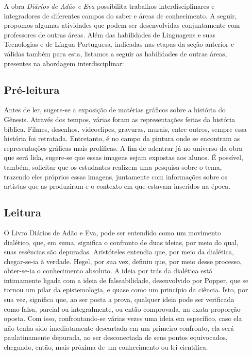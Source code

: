 \documentclass[12pt]{extarticle}
\begin{document}

A obra \emph{Diários de Adão e Eva} possibilita trabalhos
interdisciplinares e integradores de diferentes campos do saber e áreas
de conhecimento. A seguir, propomos algumas atividades que podem ser
desenvolvidas conjuntamente com professores de outras áreas. Além das
habilidades de Linguagens e suas Tecnologias e de Língua Portuguesa,
indicadas nas etapas da seção anterior e válidas também para esta,
listamos a seguir as habilidades de outras áreas, presentes na abordagem
interdisciplinar:

\subsection{Pré-leitura}

Antes de ler, sugere-se a exposição de matérias gráficos
sobre a história do Gênesis. Através dos tempos, várias foram as
representações feitas da história bíblica. Filmes, desenhos,
videoclipes, gravuras, murais, entre outros, sempre essa história foi
retratada. Entretanto, é no campo da pintura onde se encontram as
representações gráficas mais prolíficas. A fim de adentrar já no
universo da obra que será lida, sugere-se que essas imagens sejam
expostas aos alunos. É possível, também, solicitar que os estudantes
realizem uma pesquisa sobre o tema, trazendo eles próprios essas
imagens, juntamente com informações sobre os artistas que as produziram
e o contexto em que estavam inseridos na época.

\subsection{Leitura}

O Livro Diários de Adão e Eva, pode ser entendido como um
movimento dialético, que, em suma, significa o confronto de duas ideias,
por meio do qual, suas essências são depuradas. Aristóteles entendia
que, por meio da dialética, chegar-se-ia à verdade. Hegel, por sua vez,
definiu que, por meio desse processo, obter-se-ia o conhecimento
absoluto. A ideia por trás da dialética está intimamente ligada com a
ideia de falseabilidade, desenvolvido por Popper, que se tornou um pilar
da epistemologia, e quase como um princípio da ciência. Isto, por sua
vez, significa que, ao ser posta a prova, qualquer ideia pode ser
verificada como falsa, parcial ou integralmente, ou então comprovada, na
exata proporção oposta. Com isso, confrontando-se várias vezes uma ideia
em específico, caso ela não tenha sido imediatamente descartada em um
primeiro confronto, ela será paulatinamente depurada, ao ser
desconectada de seus pontos equivocados, chegando, então, mais próxima
de um conhecimento ou lei científica.
\end{document}
